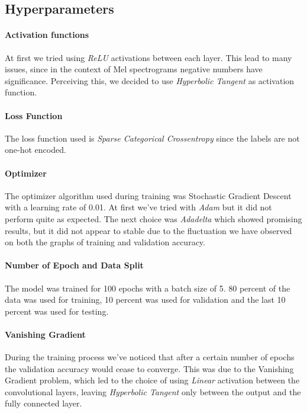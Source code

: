 \documentclass{article}
\begin{document}
    \subsection{Hyperparameters}
    \paragraph{Activation functions}
    At first we tried using \emph{ReLU} activations between each layer. This lead to many issues,
    since in the context of Mel spectrograms negative numbers have significance. Perceiving this,
    we decided to use \emph{Hyperbolic Tangent} as activation function.

    \paragraph{Loss Function}
    The loss function used is \emph{Sparse Categorical Crossentropy} since the labels are not one-hot encoded.

    \paragraph{Optimizer}
    The optimizer algorithm used during training was Stochastic Gradient Descent with a learning rate of 0.01.
    At first we've tried with \emph{Adam} but it did not perform quite as expected. The next choice
    was \emph{Adadelta} which showed promising results, but it did not appear to stable due to the
    fluctuation we have observed on both the graphs of training and validation accuracy.

    \paragraph{Number of Epoch and Data Split}
    The model was trained for 100 epochs with a batch size of 5. 80 percent of the data was used
    for training, 10 percent was used for validation and the last 10 percent was used for testing.

    \paragraph{Vanishing Gradient}

    During the training process we've noticed that after a certain number of epochs
    the validation accuracy would cease to converge. This was due to the Vanishing
    Gradient problem, which led to the choice of using \emph{Linear} activation between the
    convolutional layers, leaving \emph{Hyperbolic Tangent} only between the output and
    the fully connected layer.
\end{document}
